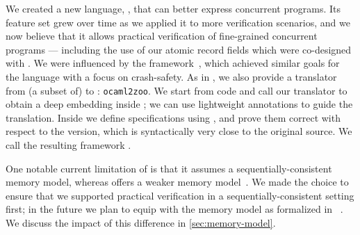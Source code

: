 We created a new \Iris language, \ZooLang, that can better express concurrent \OCaml programs. Its feature set grew over time as we applied it to more verification scenarios, and we now believe that it allows practical verification of fine-grained concurrent \OCamlFive programs --- including the use of our atomic record fields which were co-designed with \ZooLang.
We were influenced by the \Perennial framework~\citep*{DBLP:conf/sosp/ChajedTKZ19}, which achieved similar goals for the \Go language with a focus on crash-safety.
As in \Perennial, we also provide a translator from (a subset of) \OCaml to \ZooLang: \texttt{ocaml2zoo}. We start from \OCaml code and call our translator to obtain a deep \ZooLang embedding inside \Rocq; we can use lightweight annotations to guide the translation. Inside \Rocq we define specifications using \Iris, and prove them correct with respect to the \ZooLang version, which is syntactically very close to the original \OCaml source.
We call the resulting framework \Zoo.

One notable current limitation of \ZooLang is that it assumes a sequentially-consistent memory model, whereas \OCaml offers a weaker memory model~\citep*{ocaml-memory-model}. We made the choice to ensure that we supported practical verification in a sequentially-consistent setting first; in the future we plan to equip \ZooLang with the \OCaml memory model as formalized in \Cosmo~\citep*{DBLP:journals/pacmpl/MevelJP20}. We discuss the impact of this difference in \cref{sec:memory-model}.


